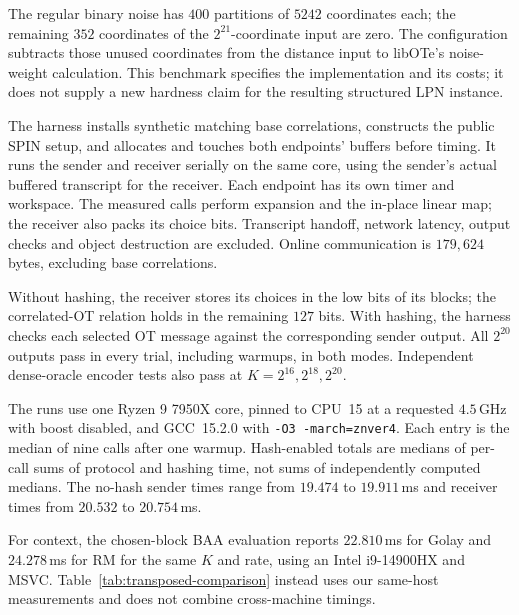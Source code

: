 The regular binary noise has $400$ partitions of $5242$ coordinates each;
the remaining $352$ coordinates of the $2^{21}$-coordinate input are zero.
The configuration subtracts those unused coordinates from the distance
input to libOTe's noise-weight calculation. This benchmark specifies the
implementation and its costs; it does not supply a new hardness claim for
the resulting structured LPN instance.

The harness installs synthetic matching base correlations, constructs the
public SPIN setup, and allocates and touches both endpoints' buffers before
timing. It runs the sender and receiver serially on the same core, using
the sender's actual buffered transcript for the receiver. Each endpoint
has its own timer and workspace. The measured calls perform expansion
and the in-place linear map; the receiver also packs its choice bits.
Transcript handoff, network latency, output checks and object destruction
are excluded. Online communication is $179{,}624$ bytes, excluding base
correlations.

Without hashing, the receiver stores its choices in the low bits of its
blocks; the correlated-OT relation holds in the remaining $127$ bits.
With hashing, the harness checks each selected OT message against the
corresponding sender output. All $2^{20}$ outputs pass in every trial,
including warmups, in both modes. Independent dense-oracle encoder tests
also pass at $K=2^{16},2^{18},2^{20}$.

The runs use one Ryzen 9 7950X core, pinned to CPU~15 at a requested
$4.5$\,GHz with boost disabled, and GCC~15.2.0 with
\texttt{-O3 -march=znver4}. Each entry is the median of nine calls after
one warmup. Hash-enabled totals are medians of per-call sums of protocol
and hashing time, not sums of independently computed medians.
The no-hash sender times range from $19.474$ to $19.911$\,ms and receiver
times from $20.532$ to $20.754$\,ms.

For context, the chosen-block BAA evaluation reports $22.810$\,ms for Golay
and $24.278$\,ms for RM for the same $K$ and rate, using an Intel
i9-14900HX and MSVC. Table~\ref{tab:transposed-comparison} instead uses
our same-host measurements and does not combine cross-machine timings.




\FloatBarrier
